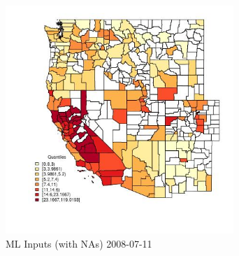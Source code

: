 
\begin{figure} 
\centering  
\includegraphics[width=0.77\textwidth]{Code_Outputs/Report_ML_input_PM25_Step4_part_e_de_duplicated_aves2008-18_noNAMwNAs_CountyPM25_ObsMean2008-07-11_2008-07-11.jpg} 
\caption{\label{fig:Report_ML_input_PM25_Step4_part_e_de_duplicated_aves2008-18_noNAMwNAsCountyPM25_ObsMean2008-07-11_2008-07-11}ML Inputs (with NAs) 2008-07-11} 
\end{figure} 
 
